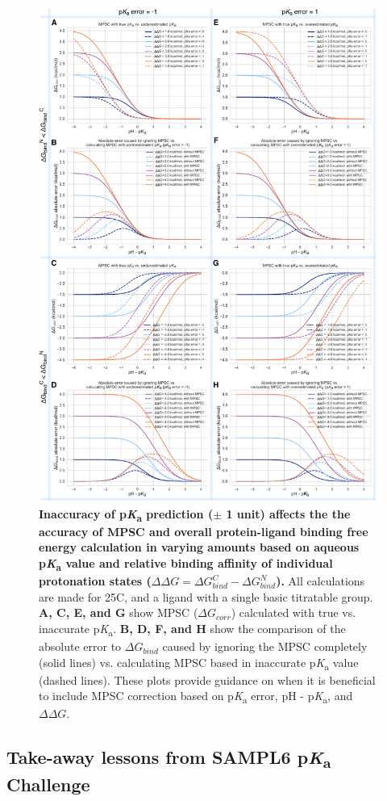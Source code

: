 \documentclass[9pt,lineno,final]{elife}
\newcommand{\pKa}{p\textit{K}\textsubscript{a}}
\begin{document}
\begin{figure}
\centering
\includegraphics[width=0.8\linewidth]{figures/pKa-inaccuracy-and-MPSC.pdf}
\caption{ {\bf Inaccuracy of \pKa{} prediction ($\pm$ 1 unit) affects the the accuracy of MPSC and overall protein-ligand binding free energy calculation in varying amounts based on aqueous \pKa{} value and relative binding affinity of individual protonation states ($\Delta\Delta G = \Delta G_{bind}^{C} - \Delta G_{bind}^{N}$).} 
All calculations are made for 25\degree C, and a ligand with a single basic titratable group. {\bf A, C, E, and G} show MPSC ($\Delta G_{corr}$) calculated with true vs. inaccurate \pKa{}. {\bf B, D, F, and H} show the comparison of the absolute error to $\Delta G_{bind}$ caused by ignoring the MPSC completely (solid lines) vs. calculating MPSC based in inaccurate \pKa{} value (dashed lines). These plots provide guidance on when it is beneficial to include MPSC correction based on \pKa{} error, pH - \pKa{}, and $\Delta\Delta G$. 
}
\label{fig:pKa-inaccuracy-and-MPSC}
\end{figure}



\subsection{Take-away lessons from SAMPL6 \pKa{} Challenge}
\end{document}
